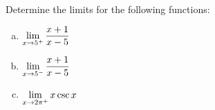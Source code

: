 \documentclass[notes]{subfiles}
\begin{document}
		\begin{ex}
			Determine the limits for the following functions:
			\begin{enumerate}[(a)]
				\item $\displaystyle \lim_{x\to 5^+} \dfrac{x+1}{x-5}$
					
				\item $\displaystyle \lim_{x\to 5^-} \dfrac{x+1}{x-5}$
					
				\item $\displaystyle \lim_{x\to 2\pi^+} x\csc x$
					
			\end{enumerate}
		\end{ex}
	\clearpage
	
\end{document}
